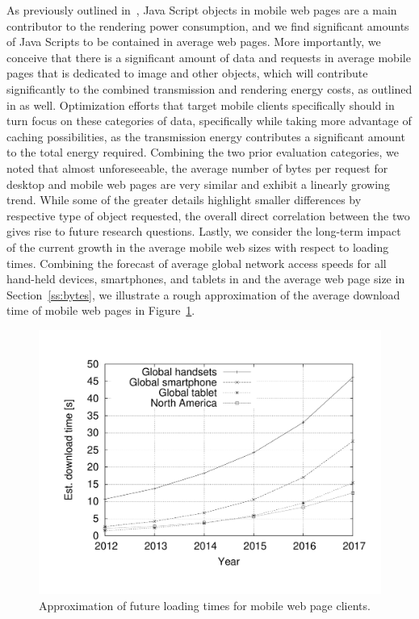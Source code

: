 \documentclass[onecolumn,12pt]{IEEEtran}
\begin{document}
%
%
As previously outlined in~\cite{ThAgNiBoSi12}, Java Script objects in mobile web pages are a main contributor to the rendering power consumption, and we find significant amounts of Java Scripts to be contained in average web pages.
More importantly, we conceive that there is a significant amount of data and requests in average mobile pages that is dedicated to image and other objects, which will contribute significantly to the combined transmission and rendering energy costs, as outlined in \cite{ThAgNiBoSi12} as well.
Optimization efforts that target mobile clients specifically should in turn focus on these categories of data, specifically while taking more advantage of caching possibilities, as the transmission energy contributes a significant amount to the total energy required.
%
%
Combining the two prior evaluation categories, we noted that almost unforeseeable, the average number of bytes per request for desktop and mobile web pages are very similar and exhibit a linearly growing trend.
While some of the greater details highlight smaller differences by respective type of object requested, the overall direct correlation between the two gives rise to future research questions.
%
%
Lastly, we consider the long-term impact of the current growth in the average mobile web sizes with respect to loading times. 
Combining the forecast of average global network access speeds for all hand-held devices, smartphones, and tablets in \cite{Ci13} and the average web page size in Section~\ref{ss:bytes}, we illustrate a rough approximation of the average download time of mobile web pages in Figure~\ref{fig:loading}.
\begin{figure}
	\centering
	\includegraphics[width=.75\linewidth]{loadtimes}
	\caption{Approximation of future loading times for mobile web page clients.\label{fig:loading}}
\end{figure}
\end{document}
